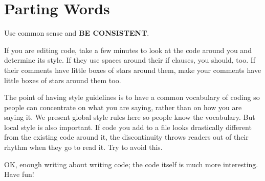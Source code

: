 \section*{Parting Words}

Use common sense and {\bfseries BE C\+O\+N\+S\+I\+S\+T\+E\+NT}.

If you are editing code, take a few minutes to look at the code around you and determine its style. If they use spaces around their if clauses, you should, too. If their comments have little boxes of stars around them, make your comments have little boxes of stars around them too.

The point of having style guidelines is to have a common vocabulary of coding so people can concentrate on what you are saying, rather than on how you are saying it. We present global style rules here so people know the vocabulary. But local style is also important. If code you add to a file looks drastically different from the existing code around it, the discontinuity throws readers out of their rhythm when they go to read it. Try to avoid this.

OK, enough writing about writing code; the code itself is much more interesting. Have fun! 